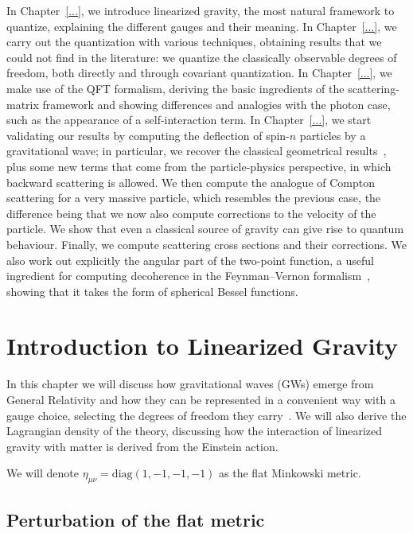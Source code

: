 \documentclass[12pt,a4paper,oneside]{article}
\numberwithin{equation}{section}   %
\begin{document}
In Chapter~\ref{...}, we introduce linearized gravity, the most natural
framework to quantize, explaining the different gauges and their meaning.
In Chapter~\ref{...}, we carry out the quantization with various techniques,
obtaining results that we could not find in the literature: we quantize the
classically observable degrees of freedom, both directly and through
covariant quantization.
In Chapter~\ref{...}, we make use of the QFT formalism, deriving the basic
ingredients of the scattering-matrix framework and showing differences and
analogies with the photon case, such as the appearance of a self-interaction
term.
In Chapter~\ref{...}, we start validating our results by computing the
deflection of spin-$n$ particles by a gravitational wave; in particular, we
recover the classical geometrical results~\cite{Peters1976}, plus some new terms that come
from the particle-physics perspective, in which backward scattering is
allowed.
We then compute the analogue of Compton scattering for a very massive
particle, which resembles the previous case, the difference being that we
now also compute corrections to the velocity of the particle. We show that
even a classical source of gravity can give rise to quantum behaviour.
Finally, we compute scattering cross sections and their corrections. We also
work out explicitly the angular part of the two-point function, a useful
ingredient for computing decoherence in the Feynman--Vernon formalism~\cite{CalzettaHu2008},
showing that it takes the form of spherical Bessel functions.
\newpage
\section{Introduction to Linearized Gravity}
In this chapter we will discuss how gravitational waves (GWs) emerge from
General Relativity and how they can be represented in a convenient way with a
gauge choice, selecting the degrees of freedom they carry~\cite{Maggiore2008,Weinberg1972}. We will also derive
the Lagrangian density of the theory, discussing how the interaction of
linearized gravity with matter is derived from the Einstein action.

We will denote $\eta_{\mu\nu} = \text{diag}(1,-1,-1,-1)$ as the flat Minkowski metric.
\subsection{Perturbation of the flat metric}
\end{document}

